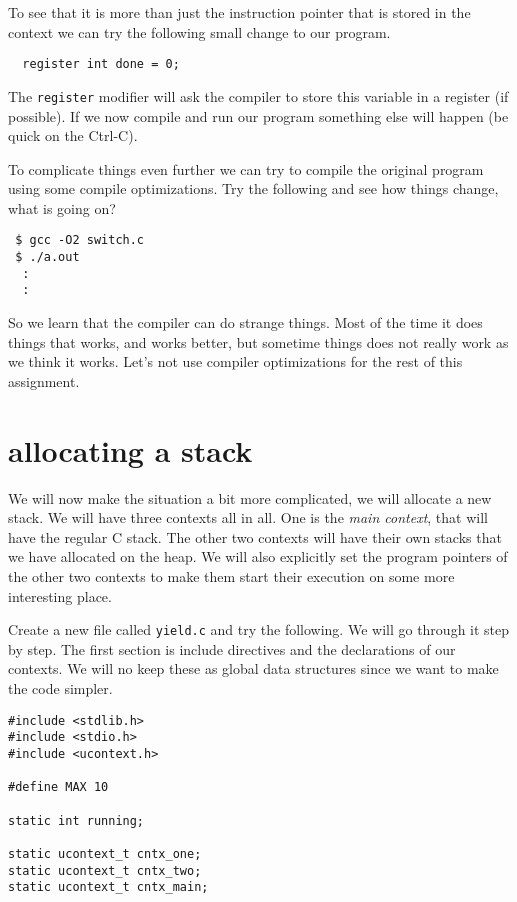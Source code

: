 \documentclass[a4paper,11pt]{article}
\begin{document}
To see that it is more than just the instruction pointer that is
stored in the context we can try the following small change to our program.

\begin{lstlisting}
  register int done = 0;
\end{lstlisting}

The {\tt register} modifier will ask the compiler to store this
variable in a register (if possible). If we now compile and run our
program something else will happen (be quick on the Ctrl-C).

To complicate things even further we can try to compile the original program
using some compile optimizations. Try the following and see how
things change, what is going on?

\begin{verbatim}
 $ gcc -O2 switch.c
 $ ./a.out 
  : 
  :
\end{verbatim}

So we learn that the compiler can do strange things. Most of the time
it does things that works, and works better, but sometime things does
not really work as we think it works. Let's not use compiler
optimizations for the rest of this assignment.

\section{allocating a stack}

We will now make the situation a bit more complicated, we will
allocate a new stack. We will have three contexts all in all. One is
the {\em main context}, that will have the regular C stack. The other
two contexts will have their own stacks that we have allocated on the
heap. We will also explicitly set the program pointers of the other
two contexts to make them start their execution on some more
interesting place. 

Create a new file called {\tt yield.c} and try the following. We will
go through it step by step. The first section is include directives
and the declarations of our contexts. We will no keep these as global
data structures since we want to make the code simpler.

\begin{lstlisting}
#include <stdlib.h>
#include <stdio.h>
#include <ucontext.h>

#define MAX 10

static int running; 

static ucontext_t cntx_one;
static ucontext_t cntx_two;
static ucontext_t cntx_main;
\end{lstlisting}
\end{document}
